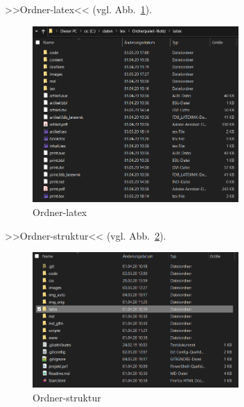 >>Ordner-latex<< (vgl. Abb.~\ref{fig:Ordner-latex}).%
\begin{figure}[H]%
  \centering
  \includegraphics[width=0.7\textwidth]{images/Ordner-latex}
  \caption{Ordner-latex}%
  \label{fig:Ordner-latex}%
\end{figure}
  

>>Ordner-struktur<< (vgl. Abb.~\ref{fig:Ordner-struktur}).%
\begin{figure}[H]%
  \centering
  \includegraphics[width=0.7\textwidth]{images/Ordner-struktur}
  \caption{Ordner-struktur}%
  \label{fig:Ordner-struktur}%
\end{figure}
  


